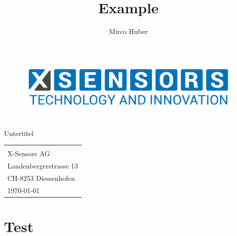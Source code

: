 \documentclass[12pt,a4paper]{article}
\author{Mirco Huber}
\title{Example}
\newcommand{\subtitle}{Untertitel}
\begin{document}
	\begin{titlepage}
		\begin{figure}[H]
			\centering
			\includegraphics[width=.5\linewidth]{Logos/X-SENSORS-Logo_Slogan_EN_Transparent.png}
		\end{figure}
		\vspace*{3cm}
		\begin{center}
			\Huge {\thetitle} \\\vspace*{.5cm}
			\small {\subtitle}
		\end{center}
		\vspace{12cm}
		\hspace{.6\linewidth} 
		\begin{tabular}{l}	
			\small{\theauthor} \\[.5pt]  
			\small{X-Sensors AG} \\ 
			\small{Landenbergerstrasse 13} \\
			\small{CH-8253 Diessenhofen} \\ [.5cm] 	
			\today
		\end{tabular}
	\end{titlepage}
	\section{Test}
	\lipsum[1-20]
\end{document}
